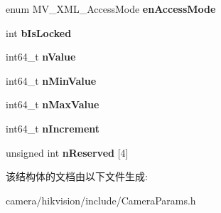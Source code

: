 \begin{DoxyCompactItemize}
\item 
\mbox{\label{struct___m_v___x_m_l___f_e_a_t_u_r_e___integer___afb74fb6279bbb4d9e5c2115694583098}} 
enum M\+V\+\_\+\+X\+M\+L\+\_\+\+Access\+Mode {\bfseries en\+Access\+Mode}
\item 
\mbox{\label{struct___m_v___x_m_l___f_e_a_t_u_r_e___integer___a87594d1743302659948c441619b706fe}} 
int {\bfseries b\+Is\+Locked}
\item 
\mbox{\label{struct___m_v___x_m_l___f_e_a_t_u_r_e___integer___a4572d57481249e770a4018719d592303}} 
int64\+\_\+t {\bfseries n\+Value}
\item 
\mbox{\label{struct___m_v___x_m_l___f_e_a_t_u_r_e___integer___af9468c2ea0c04c63fea7a2677cfc8dc6}} 
int64\+\_\+t {\bfseries n\+Min\+Value}
\item 
\mbox{\label{struct___m_v___x_m_l___f_e_a_t_u_r_e___integer___a265f16f955ebad28573e99855d867654}} 
int64\+\_\+t {\bfseries n\+Max\+Value}
\item 
\mbox{\label{struct___m_v___x_m_l___f_e_a_t_u_r_e___integer___a2accf8bd91888f30ef35f3c361725580}} 
int64\+\_\+t {\bfseries n\+Increment}
\item 
\mbox{\label{struct___m_v___x_m_l___f_e_a_t_u_r_e___integer___a07a9e55bce050fb005949e968c6529d9}} 
unsigned int {\bfseries n\+Reserved} \mbox{[}4\mbox{]}
\end{DoxyCompactItemize}


该结构体的文档由以下文件生成\+:\begin{DoxyCompactItemize}
\item 
camera/hikvision/include/Camera\+Params.\+h\end{DoxyCompactItemize}
